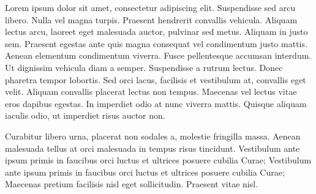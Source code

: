 Lorem ipsum dolor sit amet, consectetur adipiscing elit. Suspendisse sed arcu libero. Nulla vel magna turpis. Praesent hendrerit convallis vehicula. Aliquam lectus arcu, laoreet eget malesuada auctor, pulvinar sed metus. Aliquam in justo sem. Praesent egestas ante quis magna consequat vel condimentum justo mattis. Aenean elementum condimentum viverra. Fusce pellentesque accumsan interdum. Ut dignissim vehicula diam a semper. Suspendisse a rutrum lectus. Donec pharetra tempor lobortis. Sed orci lacus, facilisis et vestibulum at, convallis eget velit. Aliquam convallis placerat lectus non tempus. Maecenas vel lectus vitae eros dapibus egestas. In imperdiet odio at nunc viverra mattis. Quisque aliquam iaculis odio, ut imperdiet risus auctor non. 

Curabitur libero urna, placerat non sodales a, molestie fringilla massa. Aenean malesuada tellus at orci malesuada in tempus risus tincidunt. Vestibulum ante ipsum primis in faucibus orci luctus et ultrices posuere cubilia Curae; Vestibulum ante ipsum primis in faucibus orci luctus et ultrices posuere cubilia Curae; Maecenas pretium facilisis nisl eget sollicitudin. Praesent vitae nisl. 
